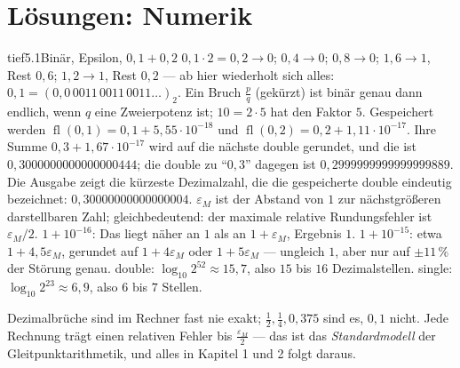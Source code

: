\chapter{Lösungen: Numerik}

\begin{loesungkarte}{tief}{5.1}{Binär, Epsilon, $0{,}1 + 0{,}2$}
$0{,}1\cdot2 = 0{,}2\to0$; $0{,}4\to0$; $0{,}8\to0$; $1{,}6\to1$, Rest $0{,}6$; $1{,}2\to1$, Rest $0{,}2$ --- ab hier wiederholt sich alles: $0{,}1 = (0{,}0\,0011\,0011\,0011\dots)_2$. Ein Bruch $\frac pq$ (gekürzt) ist binär genau dann endlich, wenn $q$ eine Zweierpotenz ist; $10 = 2\cdot5$ hat den Faktor $5$.
Gespeichert werden $\operatorname{fl}(0{,}1) = 0{,}1 + 5{,}55\cdot10^{-18}$ und $\operatorname{fl}(0{,}2) = 0{,}2 + 1{,}11\cdot10^{-17}$. Ihre Summe $0{,}3 + 1{,}67\cdot10^{-17}$ wird auf die nächste double gerundet, und die ist $0{,}3000000000000000444$; die double zu \enquote{$0{,}3$} dagegen ist $0{,}2999999999999999889$. Die Ausgabe zeigt die kürzeste Dezimalzahl, die die gespeicherte double eindeutig bezeichnet: $0{,}30000000000000004$.
$\varepsilon_M$ ist der Abstand von $1$ zur nächstgrößeren darstellbaren Zahl; gleichbedeutend: der maximale relative Rundungsfehler ist $\varepsilon_M/2$. $1 + 10^{-16}$: Das liegt näher an $1$ als an $1 + \varepsilon_M$, Ergebnis $1$. $1 + 10^{-15}$: etwa $1 + 4{,}5\varepsilon_M$, gerundet auf $1 + 4\varepsilon_M$ oder $1 + 5\varepsilon_M$ --- ungleich $1$, aber nur auf $\pm11\,\%$ der Störung genau.
double: $\log_{10}2^{52}\approx15{,}7$, also $15$ bis $16$ Dezimalstellen. single: $\log_{10}2^{23}\approx6{,}9$, also $6$ bis $7$ Stellen.
\begin{mitnehmen}\kastentext
Dezimalbrüche sind im Rechner fast nie exakt; $\frac12, \frac14, 0{,}375$ sind es, $0{,}1$ nicht. Jede Rechnung trägt einen relativen Fehler bis $\frac{\varepsilon_M}2$ --- das ist das \emph{Standardmodell} der Gleitpunktarithmetik, und alles in Kapitel 1 und 2 folgt daraus.
\end{mitnehmen}
\end{loesungkarte}

